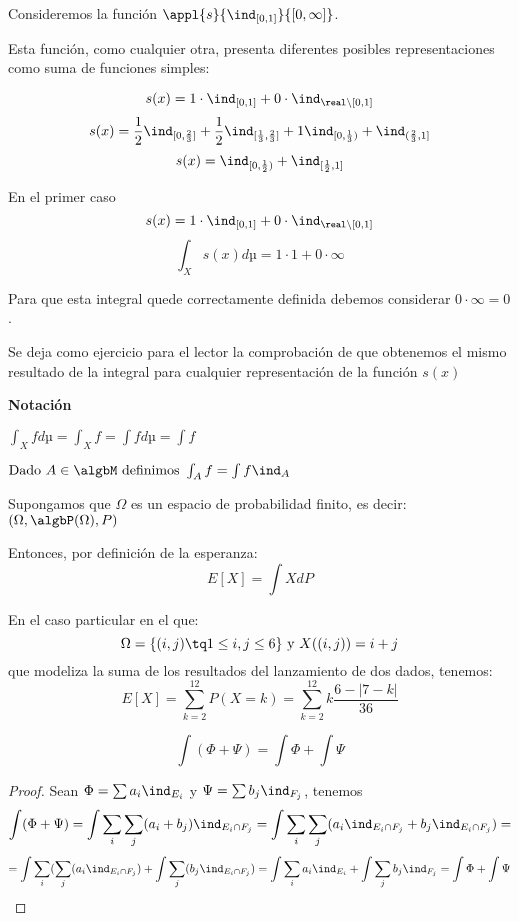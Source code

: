 \documentclass{apuntes}
\begin{document}
\begin{example}
Consideremos la función $\appl{s}{\ind_{[0,1]}}{[0, \infty]}$.

Esta función, como cualquier otra, presenta diferentes posibles representaciones como suma de funciones simples:

\[s(x) = 1\cdot \ind_{[0,1]}+0 \cdot \ind_{\real \setminus [0,1]}\]
\[s(x) = \frac{1}{2}\ind_{[0, \frac{2}{3}]} + \frac{1}{2}\ind_{[\frac{1}{3}, \frac{2}{3}]} +1\ind_{[0, \frac{1}{3})} + \ind_{(\frac{2}{3}, 1]}\]
\[s(x) = \ind_{[0, \frac{1}{2})} + \ind_{[\frac{1}{2}, 1]}\]

En el primer caso
\[s(x) = 1\cdot \ind_{[0,1]}+0 \cdot \ind_{\real \setminus [0,1]}\]
\[\int_X s(x)dµ = 1 \cdot 1 + 0 \cdot \infty\]

Para que esta integral quede correctamente definida debemos considerar $0 \cdot \infty = 0$.

Se deja como ejercicio para el lector la comprobación de que obtenemos el mismo resultado de la integral para cualquier representación de la función  $s(x)$
\end{example}

\textbf{Notación}

$\int_X f dµ = \int_X f = \int f dµ = \int f$

$\text{Dado } A \in \algbM \text{ definimos } \int_A f = \int f \ind_A$

\begin{example}
Supongamos que $\Omega$ es un espacio de probabilidad finito, es decir: $(\Omega, \algbP(\Omega), P)$

Entonces, por definición de la esperanza:
\[E[X] = \int X dP\]

En el caso particular en el que:
\[\Omega = \{(i,j) \tq 1 \leq i,j \leq 6\} \text{ y } X((i,j)) = i+j\]
que modeliza la suma de los resultados del lanzamiento de dos dados, tenemos:
\[E[X] = \sum_{k=2}^{12}P(X=k) = \sum_{k=2}^{12}k \frac{6-|7-k|}{36}\]
\end{example}

\begin{prop}
\[\int (\Phi + \Psi) = \int \Phi + \int \Psi\]
\end{prop}
\begin{proof}
Sean $\Phi = \sum a_i \ind_{E_i}$ y $\Psi  = \sum b_j \ind_{F_j}$, tenemos
\[\int (\Phi + \Psi) =\int \sum_i \sum_j (a_i+b_j)\ind_{E_i \cap F_j} =\int \sum_i \sum_j (a_i \ind_{E_i \cap F_j} + b_j \ind_{E_i \cap F_j}) = \]
\[=\int \sum_i ( \sum_j (a_i \ind_{E_i \cap F_j}) +\int \sum_j (b_j \ind_{E_i \cap F_j}) =\int \sum_i a_i \ind_{E_i} + \int \sum_j b_j \ind_{F_j} = \int \Phi + \int \Psi\]
\end{proof}
\end{document}
